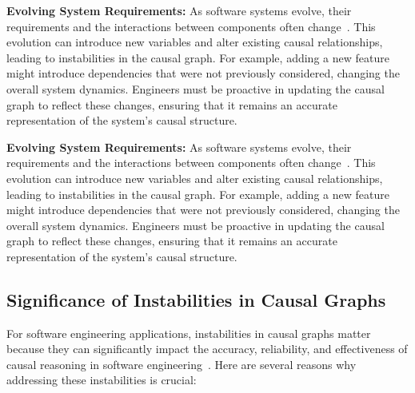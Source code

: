   \textbf{Evolving System Requirements:} As software systems evolve, their requirements and the interactions between components often change~\cite{9218193}. This evolution can introduce new variables and alter existing causal relationships, leading to instabilities in the causal graph. For example, adding a new feature might introduce dependencies that were not previously considered, changing the overall system dynamics. Engineers must be proactive in updating the causal graph to reflect these changes, ensuring that it remains an accurate representation of the system's causal structure.

      \textbf{Evolving System Requirements:} As software systems evolve, their requirements and the interactions between components often change~\cite{9218193}. This evolution can introduce new variables and alter existing causal relationships, leading to instabilities in the causal graph. For example, adding a new feature might introduce dependencies that were not previously considered, changing the overall system dynamics. Engineers must be proactive in updating the causal graph to reflect these changes, ensuring that it remains an accurate representation of the system's causal structure.

 


\subsection{Significance of Instabilities in Causal Graphs}

For software engineering applications,
instabilities in causal graphs matter because they can significantly impact the accuracy, reliability, and effectiveness of causal reasoning in software engineering~\cite{chindelevitch2012assessing}. 
Here are several reasons why addressing these instabilities is crucial:

